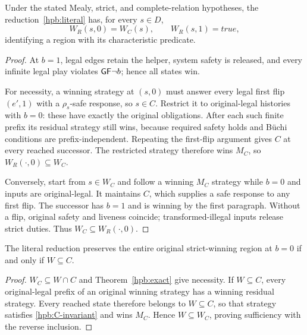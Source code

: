 

\begin{samepage}
\begin{theorem}
\label{hpb:exact}
Under the stated Mealy, strict, and complete-relation hypotheses,
the reduction~\eqref{hpb:literal} has, for every $s\in D$,
\begin{equation}
 W_R(s,0)=W_C(s),\qquad W_R(s,1)=\mathit{true},
 \label{hpb:exact-equation}
\end{equation}
identifying a region with its characteristic predicate.
\end{theorem}
\end{samepage}

\begin{proof}
At $b=1$, legal edges retain the helper, system safety is released,
and every infinite legal play violates $\mathsf{G}\mathsf{F}\neg b$; hence all states win.

For necessity, a winning strategy at $(s,0)$ must answer every legal
first flip $(e',1)$ with a $\rho_s$-safe response, so $s\in C$.
Restrict it to original-legal histories with $b=0$: these have exactly
the original obligations. After each such finite prefix its residual
strategy still wins, because required safety holds and B\"uchi conditions
are prefix-independent. Repeating the first-flip argument gives $C$ at
every reached successor. The restricted strategy therefore wins $M_C$,
so $W_R(\cdot,0)\subseteq W_C$.

Conversely, start from $s\in W_C$ and follow a winning $M_C$ strategy
while $b=0$ and inputs are original-legal. It maintains $C$, which
supplies a safe response to any first flip. The successor has $b=1$
and is winning by the first paragraph. Without a flip, original safety
and liveness coincide; transformed-illegal inputs release strict duties.
Thus $W_C\subseteq W_R(\cdot,0)$.
\end{proof}

\begin{corollary}
\label{hpb:full-preservation}
The literal reduction preserves the entire original strict-winning
region at $b=0$ if and only if $W\subseteq C$.
\end{corollary}
\begin{proof}
$W_C\subseteq W\cap C$ and Theorem~\ref{hpb:exact} give necessity.
If $W\subseteq C$, every original-legal prefix of an original winning
strategy has a winning residual strategy. Every reached state therefore
belongs to $W\subseteq C$, so that strategy satisfies
\eqref{hpb:C-invariant} and wins $M_C$. Hence $W\subseteq W_C$, proving
sufficiency with the reverse inclusion.
\end{proof}

